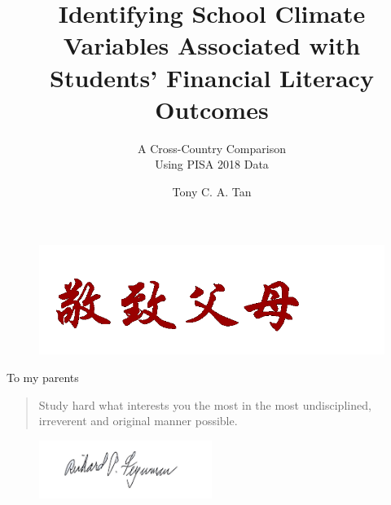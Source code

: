 \documentclass[a4paper,11pt,UKenglish,twoside,openright]{report}\usepackage[]{graphicx}\usepackage[]{color}
\title{Identifying School Climate Variables Associated with Students' Financial Literacy Outcomes}
\subtitle{A Cross-Country Comparison\\Using {PISA} 2018 Data}
\author{Tony C. A. Tan}
\begin{document}
\duoforside[
    fac={Faculty of Educational Sciences},
    dept={Centre for Educational Measurement},
    program={Science (Assessment, Measurement and Evaluation)},
    date={Spring 2021},
    short
]


\thispagestyle{empty}

\vspace*{\fill}
\begin{figure}[h]
    \includegraphics[width=\textwidth]{./Figures/To-parents.png}
\end{figure}
\begin{flushright}
To my parents
\end{flushright}
\vspace*{\fill}
\clearpage
\thispagestyle{empty}

\vspace*{3cm}

\begin{quote}
    \calligra\huge      %
\hyphenchar{}     %
Study hard what interests you the most in the most undisciplined, irreverent and original manner possible.
\end{quote}

\begin{figure}[h]
    \flushright
    \includegraphics[width=0.50\textwidth]{./Figures/Feynman-Signature.jpg}
\end{figure}
\vspace*{-1cm}
\end{document}
